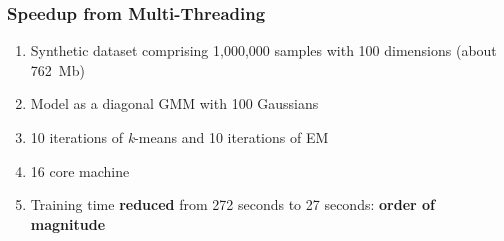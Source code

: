 \documentclass[usenames,dvipsnames]{beamer}
\begin{document}
\begin{frame}
\frametitle{Speedup from Multi-Threading}


\begin{enumerate}[{~~$\boldsymbol{\bullet}$}]

\item
Synthetic dataset comprising 1,000,000 samples with 100 dimensions  (about 762~Mb)

\item Model as a diagonal GMM with 100 Gaussians

\item 10 iterations of {\it k}-means and 10 iterations of EM

\item 16 core machine

\item Training time {\bf reduced} from 272 seconds to 27 seconds: {\bf order of magnitude}

\end{enumerate}




\end{frame}
\end{document}
